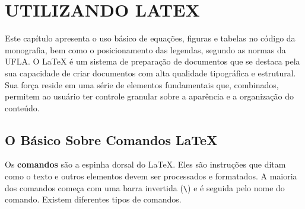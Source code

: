 \chapter{\MakeUppercase{Utilizando \LaTeX}}\label{sec:latex}

Este capítulo apresenta o uso básico de equações, figuras e tabelas no código da monografia, bem como o posicionamento das legendas, segundo as normas da UFLA. O LaTeX é um sistema de preparação de documentos que se destaca pela sua capacidade de criar documentos com alta qualidade tipográfica e estrutural. Sua força reside em uma série de elementos fundamentais que, combinados, permitem ao usuário ter controle granular sobre a aparência e a organização do conteúdo.


\section{O Básico Sobre Comandos \LaTeX}

Os \textbf{comandos} são a espinha dorsal do LaTeX. Eles são instruções que ditam como o texto e outros elementos devem ser processados e formatados. A maioria dos comandos começa com uma barra invertida (\verb|\|) e é seguida pelo nome do comando. Existem diferentes tipos de comandos.

